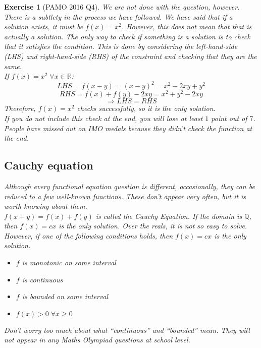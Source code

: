 \documentclass[a4paper,12pt]{article}
\newtheorem{exercise}{Exercise}[section]
\begin{document}
\begin{exercise}[PAMO 2016 Q4]
We are not done with the question, however. There is a subtlety in the process we have followed. We have said that \emph{if} a solution exists, it must be $f(x) = x^2$. However, this does not mean that that is actually a solution.
The only way to check if something is a solution is to check that it satisfies the condition. This is done by considering the left-hand-side (LHS) and right-hand-side (RHS) of the constraint and checking that they are the same.\\

If $f(x) = x^2 \; \forall x \in \mathbb{R}$:
$$LHS = f(x - y) = (x - y)^2 = x^2 - 2xy + y^2$$
$$RHS = f(x) + f(y) - 2xy = x^2 + y^2 - 2xy$$
$$\Rightarrow LHS = RHS $$
Therefore, $f(x) = x^2$ checks successfully, so it is the only solution.\\
If you do not include this check at the end, you will lose at least $1$ point out of $7$. People have missed out on IMO medals because they didn't check the function at the end.\\

\subsection{Cauchy equation}
Although every functional equation question is different, occasionally, they can be reduced to a few well-known functions. These don't appear very often, but it is worth knowing about them.\\

$f(x + y) = f(x) + f(y)$ is called the Cauchy Equation. If the domain is $\mathbb{Q}$, then $f(x) = cx$ is the only solution. Over the reals, it is not so easy to solve. However, if one of the following conditions holds, then $f(x) = cx$ is the only solution.
\begin{itemize}
    \item $f$ is monotonic on some interval
    \item $f$ is continuous
    \item $f$ is bounded on some interval
    \item $f(x) > 0 \; \forall x \ge 0$
\end{itemize}

Don't worry too much about what ``continuous'' and ``bounded'' mean. They will not appear in any Maths Olympiad questions at school level.


\end{exercise}
\end{document}
